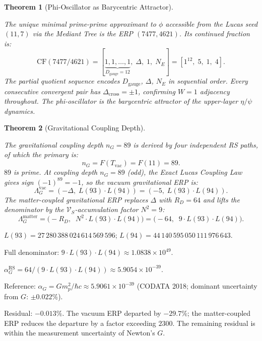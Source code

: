 \documentclass[11pt,letterpaper]{article}
\theoremstyle{plain}
\newtheorem{theorem}{Theorem}[section]
\theoremstyle{definition}
\theoremstyle{remark}
\newcommand{\aop}{\eta}
\newcommand{\Dcross}{\Delta_{\mathrm{cross}}}
\newcommand{\Dg}{D_{\mathrm{gauge}}}
\newcommand{\VS}{\mathcal{V}_S}
\newcommand{\Tvac}{T_{\mathrm{vac}}}
\newcommand{\nG}{n_G}
\newcommand{\RD}{R_D}
\newcommand{\FibN}[1]{F(#1)}
\begin{document}
\begin{theorem}[Phi-Oscillator as Barycentric Attractor]\label{thm:phi-prime}
\begin{rsbox}
The unique minimal prime-prime approximant to $\phi$ accessible from
the Lucas seed $(11,7)$ via the Mediant Tree is the ERP $(7477,4621)$.
Its continued fraction is:
\[
\mathrm{CF}(7477/4621)=[\underbrace{1,1,\ldots,1}_{\Dg=12},\;\Delta,\;1,\;N_E]
=[1^{12},\;5,\;1,\;4].
\]
The partial quotient sequence encodes $\Dg$, $\Delta$, $N_E$ in
sequential order.  Every consecutive convergent pair has
$\Dcross=\pm1$, confirming $W=1$ adjacency throughout.  The phi-oscillator is the
barycentric attractor of the upper-layer $\aop/\psi$ dynamics.
\end{rsbox}
\end{theorem}

\begin{theorem}[Gravitational Coupling Depth]\label{thm:ng}
\begin{rsbox}
The gravitational coupling depth $\nG=89$ is derived by four
independent RS paths, of which the primary is:
\[
\nG = \FibN{\Tvac} = \FibN{11} = 89.
\]
$89$ is prime.  At coupling depth $\nG=89$ (odd), the Exact Lucas
Coupling Law gives sign $(-1)^{89}=-1$, so the vacuum gravitational
ERP is:
\[
\Lambda_G^{\mathrm{vac}}=(-\Delta,\;L(93)\cdot L(94))
  =(-5,\;L(93)\cdot L(94)).
\]
The matter-coupled gravitational ERP replaces $\Delta$ with $\RD=64$
and lifts the denominator by the $\VS$-accumulation factor $N^2=9$:
\[
\Lambda_G^{\mathrm{matter}}=\bigl(-\RD,\;\;N^2\cdot L(93)\cdot L(94)\bigr)
  =\bigl(-64,\;\;9\cdot L(93)\cdot L(94)\bigr).
\]
\end{rsbox}
\end{theorem}

\begin{verifybox}
$L(93)=27\,280\,388\,024\,614\,569\,596$;\quad
$L(94)=44\,140\,595\,050\,111\,976\,643$.

Full denominator: $9\cdot L(93)\cdot L(94)\approx1.0838\times10^{49}$.

$\alpha_G^{\mathrm{RS}}=64/(9\cdot L(93)\cdot L(94))
\approx5.9054\times10^{-39}$.

Reference: $\alpha_G=Gm_p^2/\hbar c\approx5.9061\times10^{-39}$
(CODATA 2018; dominant uncertainty from $G$: $\pm0.022\%$).

Residual: $-0.013\%$.  The vacuum ERP departed by $-29.7\%$; the
matter-coupled ERP reduces the departure by a factor exceeding $2300$.
The remaining residual is within the measurement uncertainty of
Newton's $G$.
\end{verifybox}
\end{document}

